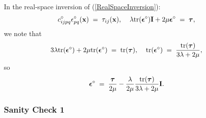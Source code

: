 \documentclass[12pt]{article}
\def\bmath#1{\mbox{\boldmath$#1$}}
\begin{document}
In the real-space inversion of (\ref{RealSpaceInversion}):
\begin{equation}
 c^\circ_{ijpq} \epsilon^\circ_{pq}({\bf x}) 
 \;=\; \tau_{ij}({\bf x}), \;\;\;\;
 \lambda{\rm tr}(\bmath{\epsilon}^\circ){\bf I} + 
 2\mu\bmath{\epsilon}^\circ \;=\; \bmath{\tau},
\end{equation}
we note that
\begin{equation}
 3\lambda{\rm tr}(\bmath{\epsilon}^\circ) + 
 2\mu {\rm tr}(\bmath{\epsilon}^\circ)
\;=\; {\rm tr}(\bmath{\tau}), \;\;\;\;
 {\rm tr}(\bmath{\epsilon}^\circ) \;=\; 
 \frac{{\rm tr}(\bmath{\tau})}{3\lambda+2\mu},
\end{equation}
so 
\begin{equation}
  \bmath{\epsilon}^\circ \;=\; \frac{\bmath{\tau}}{2\mu} - 
  \frac{\lambda}{2\mu}
 \frac{{\rm tr}(\bmath{\tau})}{3\lambda+2\mu} {\bf I}.
 \label{IsotropicStrainStress}
\end{equation}


\subsubsection{Sanity Check 1}
\end{document}
